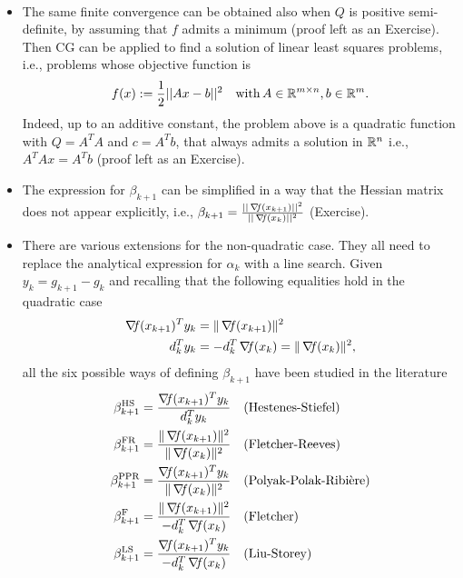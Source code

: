 \documentclass[10pt,a4paper]{article}
\begin{document}
\begin{remark} $\;$\\
	\vspace{-5mm}
	\begin{itemize}
		\item The same finite convergence can be obtained also when $Q$ is positive semi-definite, by assuming that $f$ admits a minimum (proof left as an Exercise). %
		Then CG can be applied to find a solution of linear least squares problems, i.e., problems whose objective function is
		$$ f(x):= \frac{1}{2} ||Ax-b||^2 \quad \mathord{\mathrm{with }}\, A\in \mathbb{R}^{m\times n}, b\in \mathbb{R}^m.$$
		Indeed, up to an additive constant, the problem above is a quadratic function with $Q=A^TA$ and $c=A^Tb$, that always admits a solution in $\mathbb{R}^n$ i.e., $A^TA x =A^Tb$ (proof left as an Exercise). %
		\item The expression for $\beta_{k+1}$ can be simplified in a way that the Hessian matrix does not appear explicitly, i.e., $\beta_{k+1} =\frac{||\operatorname*{\mathit{\nabla \!f}}(x_{k+1})||^2}{||\operatorname*{\mathit{\nabla \!f}}(x_k)||^2}$ (Exercise). %
		\item There are various extensions for the non-quadratic case. They all need to replace the analytical expression for $\alpha_k$ with a line search. Given $y_k = g_{k+1} - g_k$ and recalling that the following equalities hold in the quadratic case
		\begin{align*}
			\operatorname*{\mathit{\nabla \!f}}(x_{k+1})^T y_k &= \|\operatorname*{\mathit{\nabla \!f}}(x_{k+1})\|^2\\
			d_k^T y_k &= -d_k^T \operatorname*{\mathit{\nabla \!f}}(x_k) = \|\operatorname*{\mathit{\nabla \!f}}(x_k)\|^2,
		\end{align*}
		all the six possible ways of defining $\beta_{k+1}$ have been studied in the literature
		\begin{align*}
			\beta_{k+1}^{\text{HS}} &= \frac{\grad(x_{k+1})^T y_k}{d_k^T y_k} &&\text{(Hestenes-Stiefel)} \\
			\beta_{k+1}^{\text{FR}} &= \frac{\|\grad(x_{k+1})\|^2}{\|\grad(x_k)\|^2} &&\text{(Fletcher-Reeves)} \\
			\beta_{k+1}^{\text{PPR}} &= \frac{\grad(x_{k+1})^T y_k}{\|\grad(x_k)\|^2} &&\text{(Polyak-Polak-Ribière)} \\
			\beta_{k+1}^{\text{F}} &= \frac{\|\grad(x_{k+1})\|^2}{-d_k^T \grad(x_k)} &&\text{(Fletcher)} \\
			\beta_{k+1}^{\text{LS}} &= \frac{\grad(x_{k+1})^T y_k}{-d_k^T \grad(x_k)} &&\text{(Liu-Storey)} \\

\end{align*}
\end{itemize}
\end{remark}
\end{document}
